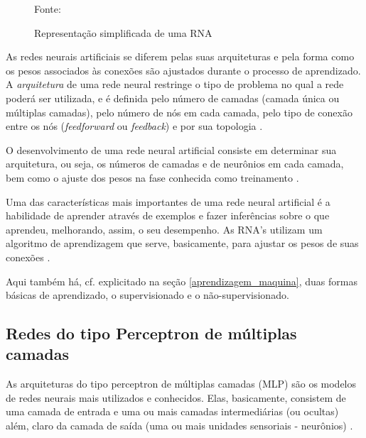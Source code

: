 \begin{figure}[H]
	\centering
	\caption{Representação simplificada de uma RNA}	

	{\scriptsize 	Fonte: }
	\label{fig:rna}
\end{figure}

As  redes  neurais  artificiais  se  diferem  pelas  suas arquiteturas e pela forma como os pesos associados às conexões são ajustados durante o processo de aprendizado. A \textit{arquitetura} de uma rede neural restringe o tipo de problema no qual a rede poderá ser utilizada, e é definida pelo  número  de  camadas  (camada única  ou múltiplas camadas), pelo número de nós em cada camada, pelo tipo de conexão entre os nós (\textit{feedforward} ou \textit{feedback}) e por sua topologia \cite[p. 46-49]{haykin_redes_2001}.

O desenvolvimento de uma rede neural artificial consiste em determinar sua arquitetura, ou seja, os números de camadas e de neurônios em cada camada, bem como o ajuste dos pesos na fase conhecida como treinamento \cite{hagan_neural_1996} \cite{haykin_redes_2001}.

Uma das características mais importantes de uma rede neural artificial é a habilidade de aprender através de exemplos e fazer inferências sobre o que aprendeu, melhorando, assim, o seu desempenho. As RNA's utilizam um algoritmo de aprendizagem que serve, basicamente, para ajustar os pesos de suas conexões \cite{haykin_redes_2001} \cite{ferneda_redes_2006} \cite{lima_ia_2016} \cite{Norvig2013}. 

Aqui também há, cf. explicitado na seção \ref{aprendizagem_maquina}, duas formas básicas de aprendizado, o supervisionado e o não-supervisionado.

\subsection{Redes do tipo Perceptron de múltiplas camadas}
As arquiteturas do tipo perceptron de múltiplas camadas (MLP) são os modelos de redes neurais mais utilizados e conhecidos. Elas, basicamente, consistem de uma camada de entrada e uma ou mais camadas intermediárias (ou ocultas) além, claro da camada de saída (uma ou mais unidades sensoriais - neurônios) \cite{haykin_redes_2001}.

